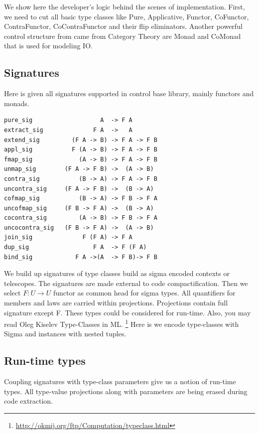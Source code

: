 \documentclass{article}
\begin{document}
We show here the developer's logic behind the scenes of implementation. First, we need
to cut all basic type classes like Pure, Applicative, Functor, CoFunctor,
ContraFunctor, CoContraFunctor and their flip eliminators. Another powerful control
structure from came from Category Theory are Monad and CoMonad that is used
for modeling IO.

\subsection{Signatures}

Here is given all signatures supported in control base library, mainly functors and monads.

\begin{lstlisting}[mathescape=true]
pure_sig                   A  -> F A
extract_sig              F A  ->   A
extend_sig         (F A -> B) -> F A -> F B
appl_sig           F (A -> B) -> F A -> F B
fmap_sig             (A -> B) -> F A -> F B
unmap_sig        (F A -> F B) ->  (A -> B)
contra_sig           (B -> A) -> F A -> F B
uncontra_sig     (F A -> F B) ->  (B -> A)
cofmap_sig           (B -> A) -> F B -> F A
uncofmap_sig     (F B -> F A) ->  (B -> A)
cocontra_sig         (A -> B) -> F B -> F A
uncocontra_sig   (F B -> F A) ->  (A -> B)
join_sig              F (F A) -> F A
dup_sig                  F A  -> F (F A)
bind_sig            F A ->(A  -> F B)-> F B
\end{lstlisting}

We build up signatures of type classes build as sigma encoded contexts or telescopes.
The signatures are made external to code compactification.
Then we select $F: U \rightarrow U$ functor as common head for sigma types.
All quantifiers for members and laws are carried within projections.
Projections contain full signature except F. These types could be considered for run-time.
Also, you may read Oleg Kiselev Type-Classes in ML. \footnote{\url{http://okmij.org/ftp/Computation/typeclass.html}}
Here is we encode type-classes with Sigma and instances with nested tuples.

\subsection{Run-time types}

Coupling signatures with type-class parameters give us a notion of run-time types.
All type-value projections along with parameters are being erased during code extraction.
\end{document}
